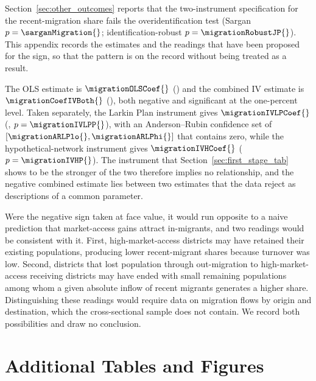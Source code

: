 \documentclass[11pt,letterpaper]{article}
\begin{document}
Section~\ref{sec:other_outcomes} reports that the two-instrument
specification for the recent-migration share fails the
overidentification test (Sargan $p=\sarganMigration{}$;
identification-robust $p=\migrationRobustJP{}$). This appendix
records the estimates and the readings that have been proposed for
the sign, so that the pattern is on the record without being treated
as a result.

The OLS estimate is $\migrationOLSCoef{}$ (\migrationOLSSE{}) and the
combined IV estimate is $\migrationCoefIVBoth{}$
(\migrationSEIVBoth{}), both negative and significant at the
one-percent level. Taken separately, the Larkin Plan instrument gives
$\migrationIVLPCoef{}$ (\migrationIVLPSE{}, $p=\migrationIVLPP{}$),
with an Anderson--Rubin confidence set of
$[\migrationARLPlo{}, \migrationARLPhi{}]$ that contains zero, while
the hypothetical-network instrument gives $\migrationIVHCoef{}$
($p=\migrationIVHP{}$). The instrument that
Section~\ref{sec:first_stage_tab} shows to be the stronger of the two
therefore implies no relationship, and the negative combined estimate
lies between two estimates that the data reject as descriptions of a
common parameter.

Were the negative sign taken at face value, it would run opposite to
a naive prediction that market-access gains attract in-migrants, and
two readings would be consistent with it. First, high-market-access
districts may have retained their existing populations, producing
lower recent-migrant shares because turnover was low. Second,
districts that lost population through out-migration to
high-market-access receiving districts may have ended with small
remaining populations among whom a given absolute inflow of recent
migrants generates a higher share. Distinguishing these readings
would require data on migration flows by origin and destination,
which the cross-sectional sample does not contain. We record both
possibilities and draw no conclusion.

\clearpage
\section{Additional Tables and Figures}
\label{app:tables}

\clearpage


\clearpage



\clearpage
\end{document}
